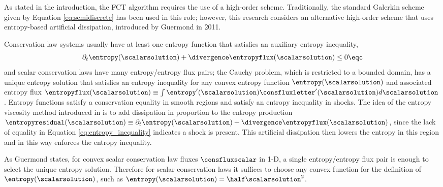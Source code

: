 As stated in the introduction, the FCT algorithm requires the use of a
high-order scheme. Traditionally, the standard Galerkin scheme given
by Equation \eqref{eq:semidiscrete} has been used in this role\cite{kuzmin_FCT};
however, this research considers an alternative high-order scheme
that uses entropy-based artificial dissipation, introduced by Guermond
in 2011\cite{guermond_ev}.

Conservation law systems usually have at
least one entropy function that satisfies an auxiliary entropy inequality,
\begin{equation}\label{eq:entropy_inequality}
  \partial_t\entropy(\scalarsolution)
    + \divergence\entropyflux(\scalarsolution) \leq 0 \eqc
\end{equation}
and scalar conservation laws have many entropy/entropy flux pairs;
the Cauchy problem, which is restricted to a bounded domain,
has a unique entropy solution that satisfies an entropy inequality
for any convex entropy function $\entropy(\scalarsolution)$ and associated
entropy flux $\entropyflux(\scalarsolution)\equiv
\int\entropy'(\scalarsolution)\mathbf{\consfluxletter}'(\scalarsolution)
  d\scalarsolution$
\cite{guermond_ev}\cite{bardos1979}\cite{kruzkov1970}.
Entropy functions satisfy a conservation equality in smooth regions and
satisfy an entropy inequality in shocks\cite{guermond_ev}. The
idea of the entropy viscosity method introduced in \cite{guermond_ev}
is to add dissipation in proportion to the entropy production
$\entropyresidual(\scalarsolution)\equiv
  \partial_t\entropy(\scalarsolution)
    + \divergence\entropyflux(\scalarsolution)$,
since the lack of equality in Equation \eqref{eq:entropy_inequality} indicates
a shock is present. This artificial dissipation then lowers the entropy
in this region and in this way enforces the entropy inequality.

As Guermond states, for convex scalar conservation law fluxes $\consfluxscalar$
in 1-D, a single entropy/entropy flux pair is enough to select the
unique entropy solution\cite{guermond_ev}\cite{lellis2004}\cite{panov1994}.
Therefore for scalar conservation laws it suffices to choose any
convex function for the definition of $\entropy(\scalarsolution)$,
such as $\entropy(\scalarsolution) = \half\scalarsolution^2$.


